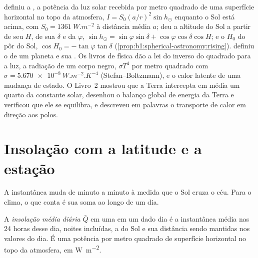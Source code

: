 \begin{recall}
 definiu a , a potência da luz solar recebida por metro
quadrado de uma superfície horizontal no topo da atmosfera, $I = S_0(a/r)^2\sin h_\odot$ enquanto
o Sol está acima, com $S_0 = \qty{1361}{W.m^{-2}}$ à distância média $a$; deu a altitude do Sol a
partir de seu  $H$, de sua  $\delta$ e da  $\varphi$,
$\sin h_\odot = \sin\varphi\sin\delta + \cos\varphi\cos\delta\cos H$; e o  $H_0$ do
pôr do Sol, $\cos H_0 = -\tan\varphi\tan\delta$ (\cref{prop:b1:spherical-astronomy:rising}).
 definiu o  de um planeta e sua . Os livros de física dão a lei do inverso do quadrado para a luz, a radiação de um corpo
negro, $\sigma T^4$ por metro quadrado com $\sigma = \qty{5.670e-8}{W.m^{-2}.K^{-4}}$
(Stefan--Boltzmann), e o calor latente de uma mudança de estado. O Livro~2 mostrou que a Terra
intercepta em média um quarto da constante solar, desenhou o balanço global de energia da Terra e
verificou que ele se equilibra, e descreveu em palavras o transporte de calor em direção aos polos.
\end{recall}

\section{Insolação com a latitude e a estação}\label{sec:b1:radiation-heat-transport:insolation}

A  instantânea muda de minuto a minuto à medida que o Sol cruza o céu. Para o clima, o que
conta é sua soma ao longo de um dia.

\begin{definition}\label{def:b1:radiation-heat-transport:daily-insolation}
A \emph{insolação média diária} $\bar Q$ em uma  em um dado
dia é a  instantânea média nas 24 horas desse dia, noites incluídas, a  do Sol
e sua distância sendo mantidas nos valores do dia. É uma potência por metro quadrado de superfície
horizontal no topo da atmosfera, em \unit{W.m^{-2}}.
\end{definition}

